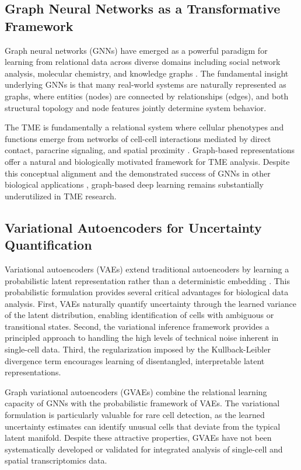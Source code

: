 \documentclass{article}
\begin{document}
\subsection{Graph Neural Networks as a Transformative Framework}

Graph neural networks (GNNs) have emerged as a powerful paradigm for learning from relational data across diverse domains including social network analysis, molecular chemistry, and knowledge graphs \citep{wu2020comprehensive}. The fundamental insight underlying GNNs is that many real-world systems are naturally represented as graphs, where entities (nodes) are connected by relationships (edges), and both structural topology and node features jointly determine system behavior.

The TME is fundamentally a relational system where cellular phenotypes and functions emerge from networks of cell-cell interactions mediated by direct contact, paracrine signaling, and spatial proximity \citep{armingol2021deciphering}. Graph-based representations offer a natural and biologically motivated framework for TME analysis. Despite this conceptual alignment and the demonstrated success of GNNs in other biological applications \citep{zitnik2018modeling}, graph-based deep learning remains substantially underutilized in TME research.

\subsection{Variational Autoencoders for Uncertainty Quantification}

Variational autoencoders (VAEs) extend traditional autoencoders by learning a probabilistic latent representation rather than a deterministic embedding \citep{kingma2013auto}. This probabilistic formulation provides several critical advantages for biological data analysis. First, VAEs naturally quantify uncertainty through the learned variance of the latent distribution, enabling identification of cells with ambiguous or transitional states. Second, the variational inference framework provides a principled approach to handling the high levels of technical noise inherent in single-cell data. Third, the regularization imposed by the Kullback-Leibler divergence term encourages learning of disentangled, interpretable latent representations.

Graph variational autoencoders (GVAEs) \citep{kipf2016variational} combine the relational learning capacity of GNNs with the probabilistic framework of VAEs. The variational formulation is particularly valuable for rare cell detection, as the learned uncertainty estimates can identify unusual cells that deviate from the typical latent manifold. Despite these attractive properties, GVAEs have not been systematically developed or validated for integrated analysis of single-cell and spatial transcriptomics data.
\end{document}
